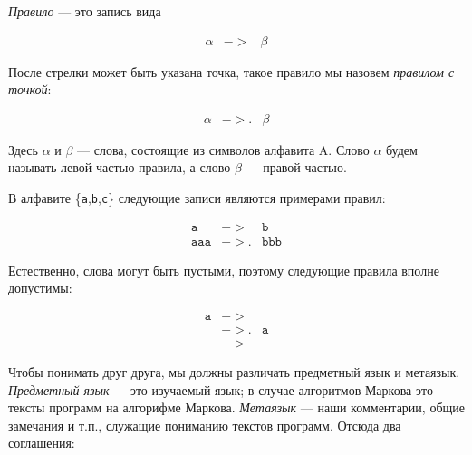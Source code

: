 \documentclass[12pt,a4paper,oneside]{article}
\newcommand{\s}[1]{\texttt{#1}}
\begin{document}
\begin{definition}\emph{Правило} --- это запись вида 
\begin{bnf}\begin{eqnarray*}\alpha &->& \beta \end{eqnarray*}\end{bnf}После
стрелки может быть указана точка, такое правило мы назовем 
\emph{правилом с точкой}:
\begin{bnf}\begin{eqnarray*}\alpha &->.& \beta \end{eqnarray*}\end{bnf}Здесь 
$\alpha$ и $\beta$ --- слова, состоящие из символов алфавита A. 
Слово $\alpha$ будем называть левой частью правила, а слово $\beta$ --- правой частью.
\end{definition}

\begin{example}В алфавите \{\s{a},\s{b},\s{c}\} следующие записи являются примерами правил: 
\begin{bnf}\begin{eqnarray*}
  \s{a} &->& \s{b}\\
  \s{aaa} &->.& \s{bbb}
\end{eqnarray*}
\end{bnf}Естественно, слова могут быть пустыми, поэтому следующие правила вполне допустимы:
\begin{bnf}\begin{eqnarray*}
 \s{a} &->&\\
 &->.& \s{a}\\
 &->&
\end{eqnarray*}\end{bnf}  
\end{example}

Чтобы понимать друг друга, мы должны различать предметный язык и метаязык. \emph{Предметный язык} --- это
изучаемый язык; в случае алгоритмов Маркова это тексты программ на алгорифме Маркова.
\emph{Метаязык} --- наши комментарии, общие замечания и т.п., служащие пониманию текстов программ.
Отсюда два соглашения:
\end{document}

